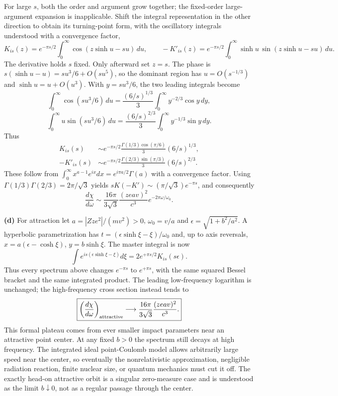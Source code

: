 For large $s$, both the order and argument grow together; the
fixed-order large-argument expansion is inapplicable.  Shift the
integral representation in the other direction to obtain its
turning-point form, with the oscillatory integrals understood
with a convergence factor,
\[
K_{is}(z)=e^{-\pi s/2}\int_0^\infty
 \cos(z\sinh u-su)\,du,\qquad
-K'_{is}(z)=e^{-\pi s/2}\int_0^\infty
 \sinh u\,\sin(z\sinh u-su)\,du.
\]
The derivative holds $s$ fixed.  Only afterward set $z=s$.
The phase is $s(\sinh u-u)=su^3/6+O(su^5)$, so the
dominant region has $u=O(s^{-1/3})$ and $\sinh u=u+O(u^3)$.
With $y=su^3/6$, the two leading integrals become
\[
\int_0^\infty\cos(su^3/6)\,du
=\frac{(6/s)^{1/3}}3\int_0^\infty y^{-2/3}\cos y\,dy,
\]
\[
\int_0^\infty u\sin(su^3/6)\,du
=\frac{(6/s)^{2/3}}3\int_0^\infty y^{-1/3}\sin y\,dy.
\]
Thus
\begin{align*}
K_{is}(s)&\sim e^{-\pi s/2}\frac{\Gamma(1/3)\cos(\pi/6)}3
 (6/s)^{1/3},\\
-K'_{is}(s)&\sim e^{-\pi s/2}\frac{\Gamma(2/3)\sin(\pi/3)}3
 (6/s)^{2/3}.
\end{align*}
These follow from $\int_0^\infty x^{a-1}e^{ix}dx
=e^{i\pi a/2}\Gamma(a)$ with a convergence factor.
Using $\Gamma(1/3)\Gamma(2/3)=2\pi/\sqrt3$ yields
$sK(-K')\sim(\pi/\sqrt3)e^{-\pi s}$, and consequently
\[
\boxed{\frac{d\chi}{d\omega}\sim
\frac{16\pi}{3\sqrt3}\frac{(zeav)^2}{c^3}
 e^{-2\pi\omega/\omega_0}.}
\]

\medskip\noindent\textbf{(d)} For attraction let
$a=|Zze^2|/(mv^2)>0$, $\omega_0=v/a$ and
$\epsilon=\sqrt{1+b^2/a^2}$.  A hyperbolic parametrization has
$t=(\epsilon\sinh\xi-\xi)/\omega_0$ and, up to axis reversals,
$x=a(\epsilon-\cosh\xi)$, $y=b\sinh\xi$.
The master integral is now
\[
\int e^{is(\epsilon\sinh\xi-\xi)}d\xi
=2e^{+\pi s/2}K_{is}(s\epsilon).
\]
Thus every spectrum above changes $e^{-\pi s}$ to $e^{+\pi s}$,
with the same squared Bessel bracket and the same integrated product.
The leading low-frequency logarithm is unchanged; the high-frequency
cross section instead tends to
\[
\boxed{\left(\frac{d\chi}{d\omega}\right)_{\rm attractive}
\longrightarrow\frac{16\pi}{3\sqrt3}\frac{(zeav)^2}{c^3}.}
\]
This formal plateau comes from ever smaller impact parameters near
an attractive point center.  At any fixed $b>0$ the spectrum still
decays at high frequency.  The integrated ideal point-Coulomb model
allows arbitrarily large speed near the center, so eventually the
nonrelativistic approximation, negligible radiation reaction, finite
nuclear size, or quantum mechanics must cut it off.  The exactly
head-on attractive orbit is a singular zero-measure case and is
understood as the limit $b\downarrow0$, not as a regular passage
through the center.

